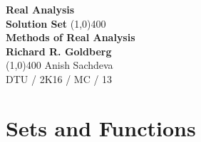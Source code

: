 \documentclass[11pt, letterpaper]{article}
\begin{document}
\begin{titlepage}
\begin{center}
\vspace*{1cm}
\Large{\textbf {Real Analysis}}\\
\Large{\textbf{Solution Set}}
\vfill
\line(1,0){400}\\[1mm]
\huge{\textbf{Methods of Real Analysis}}\\[3mm]
\Large{\textbf{Richard R. Goldberg}}\\[1mm]
\line(1,0){400}
\vfill
Anish Sachdeva\\
DTU / 2K16 / MC / 13\\
\end{center}
\end{titlepage}

\tableofcontents
\thispagestyle{empty}
\clearpage

\setcounter{page}{1}

\def\exr{Exercise}
\def\space{\,\,\,}
\def\spacem{\,\,\,\,}
\def\we{\mathrm{We \space know \space that}}
\def\wealso{\mathrm{We \space also \space know \space that}}
\def\from{\mathrm{From \space}}
\def\hence{\mathrm{Hence \spacem Proved}}
\def\no{\nonumber}

\section{Sets and Functions}
\end{document}
